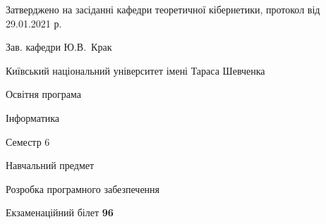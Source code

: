 \documentclass[10pt, ukrainian]{article}
\begin{document}
{\vspace{5mm}\smallskip \begin {small} Затверджено на засіданні кафедри теоретичної кібернетики, протокол  від   29.01.2021 р.\par\smallskip\smallskip
{\parbox {6.5 cm}{Зав. кафедри \dotfill Ю.В.~Крак}} \end{small}}
\newpage

{{\begin {small}\par
{ \center  Київський національний університет імені Тараса Шевченка \par}
{\parbox {5 cm}{Освітня програма \hfill}{\parbox {7 cm}{Інформатика \hfill}}\parbox {6 cm}{\hfill Семестр 6}}\par
{\parbox {5 cm} {Навчальний предмет \hfill}\parbox {7 cm}{Розробка програмного забезпечення \hfill}\parbox {6cm}{\hfill}\par}\vspace{-7pt} \end{small}}{\center Екзаменаційний білет \No \textbf
{ 96 }\par}}
\end{document}
